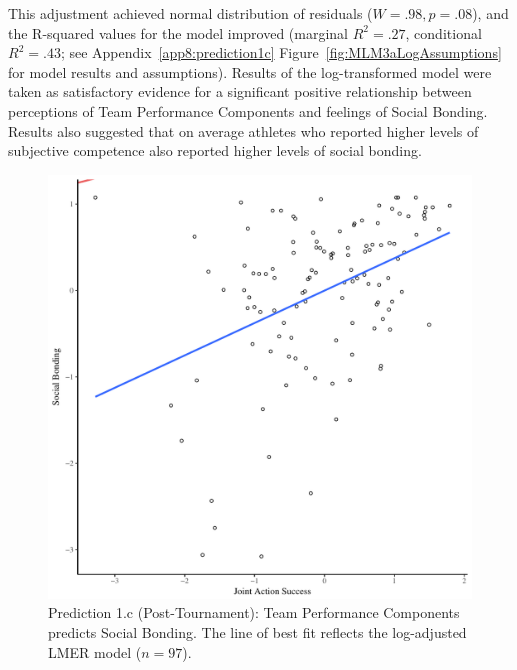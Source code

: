 \begin{CJK}{UTF8}{gbsn}
This adjustment achieved normal distribution of residuals ($W = .98, p = .08$), and the R-squared values for the model improved (marginal $R^2 = .27$, conditional $R^2 = .43$; see Appendix~\ref{app8:prediction1c} Figure~\ref{fig:MLM3aLogAssumptions} for model results and assumptions).  Results of the log-transformed model were taken as satisfactory evidence for a significant positive relationship between perceptions of Team Performance Components and feelings of Social Bonding.  Results also suggested that on average athletes who reported higher levels of subjective competence also reported higher levels of social bonding.


  \begin{figure}[htbp]
    \centering
  \includegraphics[scale=.5]{images/jasBondModelSlope.pdf}
    \caption{Prediction 1.c (Post-Tournament): Team Performance Components predicts Social Bonding. The line of best fit reflects the log-adjusted LMER model ($n = 97$).}
    \label{fig:jasBondModelSlope}
  \end{figure}



\end{CJK}
